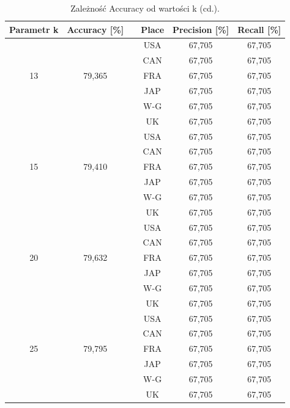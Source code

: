 \documentclass{classrep}
\begin{document}
\begin{table}[h!]
	\centering
	\begin{tabular} {c c c c c c}
		\hline
		\textbf{Parametr k} & \textbf{Accuracy [\%]} & \vline & \textbf{Place} & \textbf{Precision [\%]} & \textbf{Recall [\%]}\\ [0.5ex] 
		\hline	
		\hline 
		&   		&\vline& USA & 67,705 & 67,705 \\
		&			&\vline& CAN & 67,705 & 67,705 \\
		13 & 79,365 &\vline& FRA & 67,705 & 67,705 \\
		&			&\vline& JAP & 67,705 & 67,705 \\
		&			&\vline& W-G & 67,705 & 67,705 \\
		&			&\vline& UK  & 67,705 & 67,705 \\
		\hline 
		&   		&\vline& USA & 67,705 & 67,705 \\
		&			&\vline& CAN & 67,705 & 67,705 \\
		15 & 79,410	&\vline& FRA & 67,705 & 67,705 \\
		&			&\vline& JAP & 67,705 & 67,705 \\
		&			&\vline& W-G & 67,705 & 67,705 \\
		&			&\vline& UK  & 67,705 & 67,705 \\
		\hline 
		&   		&\vline& USA & 67,705 & 67,705 \\
		&			&\vline& CAN & 67,705 & 67,705 \\
		20 & 79,632 &\vline& FRA & 67,705 & 67,705 \\
		&			&\vline& JAP & 67,705 & 67,705 \\
		&			&\vline& W-G & 67,705 & 67,705 \\
		&			&\vline& UK  & 67,705 & 67,705 \\
		\hline 
		&   		&\vline& USA & 67,705 & 67,705 \\
		&			&\vline& CAN & 67,705 & 67,705 \\
		25 & 79,795 &\vline& FRA & 67,705 & 67,705 \\
		&			&\vline& JAP & 67,705 & 67,705 \\
		&			&\vline& W-G & 67,705 & 67,705 \\
		&			&\vline& UK  & 67,705 & 67,705 \\
		\hline
		\hline
\end{tabular}
\caption{Zależność Accuracy od wartości k (cd.). }
\label{tabelaK2}
\end{table}
\end{document}
